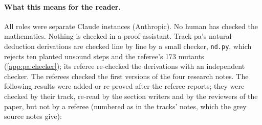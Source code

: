 \paragraph{What this means for the reader.} All roles were separate Claude instances (Anthropic). No human has checked the mathematics. Nothing is checked in a proof assistant. Track pa's natural-deduction derivations are checked line by line by a small checker, \texttt{nd.py}, which rejects ten planted unsound steps and the referee's 173 mutants (\cref{app:pa:checker}); its referee re-checked the derivations with an independent checker. The referees checked the first versions of the four research notes. The following results were added or re-proved after the referee reports; they were checked by their track, re-read by the section writers and by the reviewers of the paper, but not by a referee (numbered as in the tracks' notes, which the grey source notes give):
